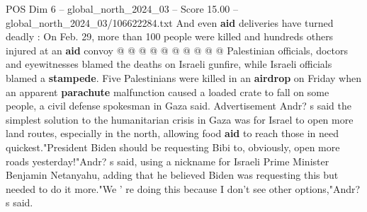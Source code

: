 \begin{textsample}{POS Dim 6 – global\_north\_2024\_03 – Score 15.00 – global\_north\_2024\_03/106622284.txt}
And even \textbf{aid} deliveries have turned deadly : On Feb. 29, more than 100 people were killed and hundreds others injured at an \textbf{aid} convoy @ @ @ @ @ @ @ @ @ @ Palestinian officials, doctors and eyewitnesses blamed the deaths on Israeli gunfire, while Israeli officials blamed a \textbf{stampede}.
Five Palestinians were killed in an \textbf{airdrop} on Friday when an apparent \textbf{parachute} malfunction caused a loaded crate to fall on some people, a civil defense spokesman in Gaza said.
Advertisement Andr? s said the simplest solution to the humanitarian crisis in Gaza was for Israel to open more land routes, especially in the north, allowing food \textbf{aid} to reach those in need quickest."President Biden should be requesting Bibi to, obviously, open more roads yesterday!"Andr? s said, using a nickname for Israeli Prime Minister Benjamin Netanyahu, adding that he believed Biden was requesting this but needed to do it more."We ' re doing this because I don't see other options,"Andr? s said.

\end{textsample}
